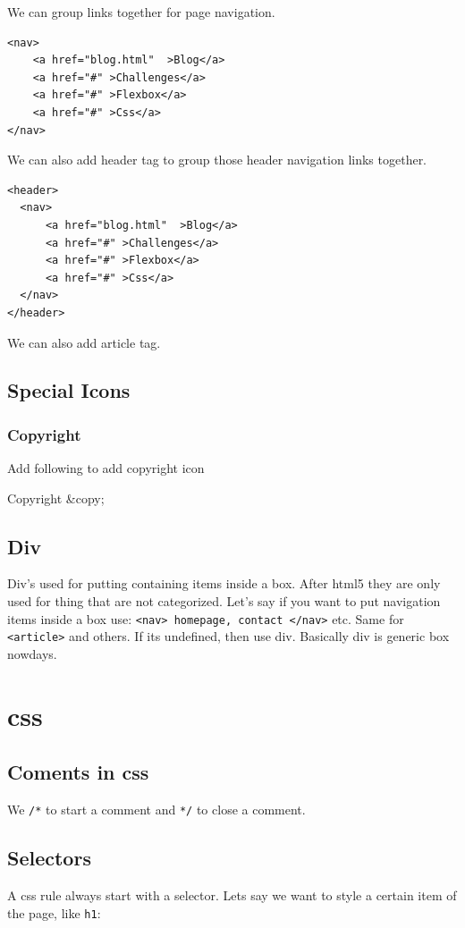 \documentclass[11pt]{article}
\begin{document}
We can group links together for page navigation.

\begin{verbatim}
<nav>
    <a href="blog.html"  >Blog</a>
    <a href="#" >Challenges</a>
    <a href="#" >Flexbox</a>
    <a href="#" >Css</a>
</nav>
\end{verbatim}


We can also add header tag to group those header navigation links together.

\begin{verbatim}
<header>
  <nav>
      <a href="blog.html"  >Blog</a>
      <a href="#" >Challenges</a>
      <a href="#" >Flexbox</a>
      <a href="#" >Css</a>
  </nav>
</header>
\end{verbatim}

We can also add article tag.
\subsection{Special Icons}
\label{sec:org60b0817}
\subsubsection{Copyright}
\label{sec:org98b0b83}
Add following to add copyright icon

Copyright \&copy;
\subsection{Div}
\label{sec:orgf747949}
Div's used for putting containing items inside a box. After html5 they are only used for thing that are not categorized. Let's say if you want to put navigation items inside a box use: \texttt{<nav> homepage, contact </nav>} etc. Same for \texttt{<article>} and others. If its undefined, then use div. Basically div is generic box nowdays.
\section{css}
\label{sec:orga101a14}
\subsection{Coments in css}
\label{sec:org90add34}
We \texttt{/*} to start a comment and \texttt{*/} to close a comment.
\subsection{Selectors}
\label{sec:org06713b0}
A css rule always start with a selector. Lets say we want to style a certain item of the page, like \texttt{h1}:
\end{document}
